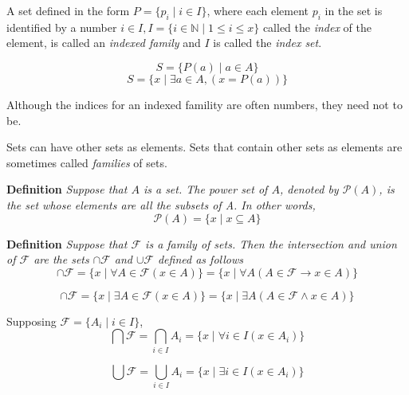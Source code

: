 A set defined in the form $P = \{p_i \mid i \in I\}$, where each element $p_i$ in the set is identified by a number $i \in I,  I=\{i \in \mathbb{N} \mid 1 \leq i \leq x \}$ called the \textit{index} of the element, is called an \textit{indexed family} and $I$ is called the \textit{index set}.

\[S = \{P(a) \mid a \in A\}\]
\[S = \{x \mid \exists a \in A,(x = P(a))\}\]


Although the indices for an indexed famility are often numbers, they need not to be.

Sets can have other sets as elements. Sets that contain other sets as elements are sometimes called \textit{families} of sets.

\textbf{Definition} \textit{Suppose that $A$ is a set. The power set of $A$, denoted by $\mathscr{P}(A)$, is the set whose elements are all the subsets of A. In other words, }
\[\mathscr{P}(A) = \{x \mid x \subseteq A\}\]

\textbf{Definition} \textit{Suppose that $\mathscr{F}$ is a family of sets. Then the intersection and union of $\mathscr{F}$ are the sets $\cap \mathscr{F}$ and $\cup \mathscr{F}$ defined as follows}
\[\cap \mathscr{F} = \{x \mid \forall A \in \mathscr{F} (x \in A)\} = \{x \mid \forall A (A \in \mathscr{F} \rightarrow x \in A)\}\]

\[\cap \mathscr{F} = \{x \mid \exists A \in \mathscr{F} (x \in A)\} = \{x \mid \exists A (A \in \mathscr{F} \land x \in A)\}\]

Supposing $\mathscr{F} = \{A_i \mid i \in I\}$,
\[\bigcap \mathscr{F} = \bigcap_{i \in I} A_i = \{x \mid \forall i \in I (x \in A_i)\}\]

\[\bigcup \mathscr{F} = \bigcup_{i \in I} A_i = \{x \mid \exists i \in I (x \in A_i)\}\]

